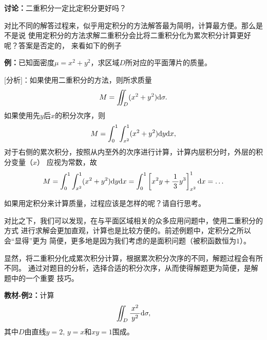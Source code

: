 \begin{shaded}

{\bf 讨论：}二重积分一定比定积分更好吗？

对比不同的解答过程来，似乎用定积分的方法解答最为简明，计算最方便。那么是不是说
使用定积分的方法求解二重积分会比将二重积分化为累次积分计算更好呢？答案是否定的，
来看如下的例子

{\bf 例：}已知面密度$\mu=x^2+y^2$，求区域$D$所对应的平面薄片的质量。

[分析]：如果使用二重积分的方法，则所求质量
$$M=\iint_D(x^2+y^2)\mathrm{d}\sigma.$$
如果使用先$y$后$x$的积分次序，则
$$M=\displaystyle\int_0^1\displaystyle\int_{x^2}^1(x^2+y^2)\mathrm{d} y\mathrm{d} x,$$
对于右侧的累次积分，按照从内至外的次序进行计算，计算内层积分时，外层的积分变量（$x$）
应视为常数，故
$$M=\displaystyle\int_0^1\displaystyle\int_{x^2}^1(x^2+y^2)\mathrm{d} y\mathrm{d} x
=\displaystyle\int_0^1\left[x^2y+\displaystyle\frac{\,{1}\,}{\,{3}\,}y^3\right]_{x^2}^1\mathrm{d} x=\ldots$$

如果用定积分来计算质量，过程应该是怎样的呢？请自行思考。

对比之下，我们可以发现，在与平面区域相关的众多应用问题中，使用二重积分的方式
进行求解会更加直观，计算也是比较方便的。前述例题中，定积分之所以会“显得”更为
简便，更多地是因为我们考虑的是面积问题（被积函数恒为$1$）。

\end{shaded}
% 

% 

显然，将二重积分化成累次积分计算，根据累次积分次序的不同，解题过程会有所不同。
通过对题目的分析，选择合适的积分次序，从而使得解题更为简便，是解题中的一个重要
技巧。

{\bf 教材-例2：}计算
$$\iint_D\displaystyle\frac{\,{x^2}\,}{\,{y^2}\,}\mathrm{d}\sigma,$$
其中$D$由直线$y=2,\,y=x$和$xy=1$围成。


